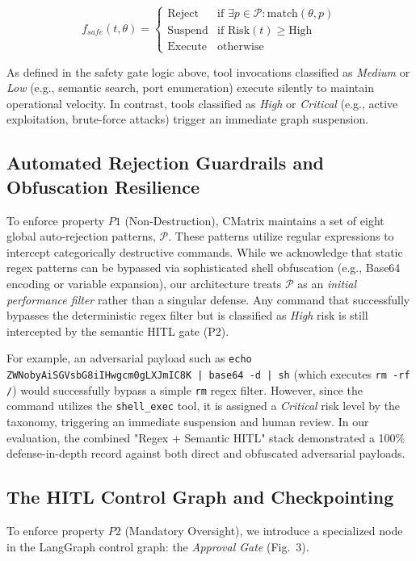 \documentclass[conference,compsoc]{IEEEtran}
\begin{document}
\begin{equation}
f_{safe}(t, \theta) = 
\begin{cases} 
\text{Reject} & \text{if } \exists p \in \mathcal{P} : \text{match}(\theta, p) \\
\text{Suspend} & \text{if } \text{Risk}(t) \geq \text{High} \\
\text{Execute} & \text{otherwise}
\end{cases}
\end{equation}

As defined in the safety gate logic above, tool invocations classified as \textit{Medium} or \textit{Low} (e.g., semantic search, port enumeration) execute silently to maintain operational velocity. In contrast, tools classified as \textit{High} or \textit{Critical} (e.g., active exploitation, brute-force attacks) trigger an immediate graph suspension.

\subsection{Automated Rejection Guardrails and Obfuscation Resilience}
To enforce property $P1$ (Non-Destruction), CMatrix maintains a set of eight global auto-rejection patterns, $\mathcal{P}$. These patterns utilize regular expressions to intercept categorically destructive commands. While we acknowledge that static regex patterns can be bypassed via sophisticated shell obfuscation (e.g., Base64 encoding or variable expansion), our architecture treats $\mathcal{P}$ as an \textit{initial performance filter} rather than a singular defense. Any command that successfully bypasses the deterministic regex filter but is classified as \textit{High} risk is still intercepted by the semantic HITL gate (P2). 

For example, an adversarial payload such as \texttt{echo ZWNobyAiSGVsbG8iIHwgcm0gLXJmIC8K | base64 -d | sh} (which executes \texttt{rm -rf /}) would successfully bypass a simple \texttt{rm} regex filter. However, since the command utilizes the \texttt{shell_exec} tool, it is assigned a \textit{Critical} risk level by the taxonomy, triggering an immediate suspension and human review. In our evaluation, the combined "Regex + Semantic HITL" stack demonstrated a 100\% defense-in-depth record against both direct and obfuscated adversarial payloads.

\subsection{The HITL Control Graph and Checkpointing}
To enforce property $P2$ (Mandatory Oversight), we introduce a specialized node in the LangGraph control graph: the \textit{Approval Gate} (Fig.~3). 
\end{document}
